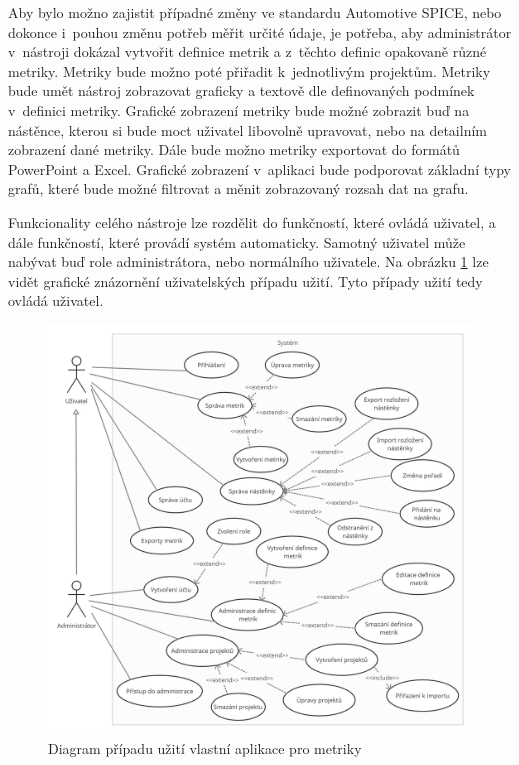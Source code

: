 \documentclass[czech,master]{diploma}
\begin{document}
Aby bylo možno zajistit případné změny ve standardu Automotive SPICE, nebo dokonce i~pouhou změnu potřeb měřit určité údaje, je potřeba, aby administrátor v~nástroji dokázal vytvořit definice metrik a z~těchto definic opakovaně různé metriky. Metriky bude možno poté přiřadit k~jednotlivým projektům. Metriky bude umět nástroj zobrazovat graficky a textově dle definovaných podmínek v~definici metriky. Grafické zobrazení metriky bude možné zobrazit buď na nástěnce, kterou si bude moct uživatel libovolně upravovat, nebo na detailním zobrazení dané metriky. Dále bude možno metriky exportovat do formátů PowerPoint a Excel. Grafické zobrazení v~aplikaci bude podporovat základní typy grafů, které bude možné filtrovat a měnit zobrazovaný rozsah dat na grafu.

Funkcionality celého nástroje lze rozdělit do funkčností, které ovládá uživatel, a dále funkčností, které provádí systém automaticky. Samotný uživatel může nabývat buď role administrátora, nebo normálního uživatele. Na obrázku \ref{fig:jazz_metrics_use_case} lze vidět grafické znázornění uživatelských případu užití. Tyto případy užití tedy ovládá uživatel.

\begin{figure}[!ht]
    \centering
    \includegraphics[width=1\textwidth]{Diplomka/Figures/use_case_jazz.png}
    \caption{Diagram případu užití vlastní aplikace pro metriky}
    \label{fig:jazz_metrics_use_case}
\end{figure}
\end{document}
